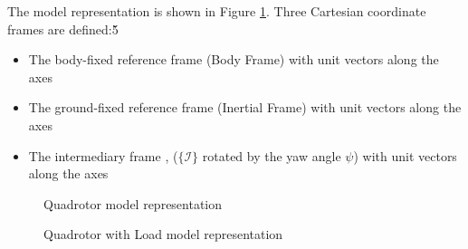 The  model representation is shown in Figure \ref{fig:mod.model}. Three Cartesian coordinate frames are defined:\v{5}
\begin{itemize}
	\setlength\itemsep{.2pt}
	\item The body-fixed reference frame  (Body Frame)
	\subitem with unit vectors  along the axes
	\item The ground-fixed reference frame  (Inertial Frame)
	\subitem with unit vectors  along the axes								
	\item The intermediary frame , ($ \{\mathcal{I} \}$ rotated by the yaw angle $ \psi $) 
	\subitem with unit vectors  along the axes								
\end{itemize}

\begin{figure}[h!]
	\centering
	\caption{Quadrotor model representation\label{fig:mod.model}}
\end{figure}	

\begin{figure}[h!]
	\centering
	\caption{Quadrotor with Load model representation\label{fig:mod.modelQRL}}
\end{figure}	

